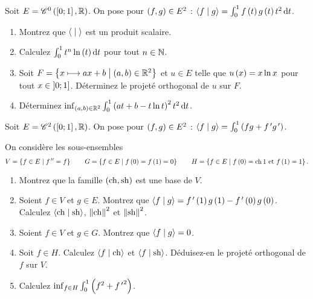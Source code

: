 \begin{exo}
Soit \(E=\mathscr{C}^{0}\left(\left[0;1\right],\mathbb{R}\right)\). On pose pour \(\left(f,g\right)\in E^2\) : \(\ps{f}{g}=\int_0^1f\paren{t}g\paren{t}t^2\odif{t}\).

\begin{enumerate}
    \item Montrez que \(\left\langle\;\middle|\;\right\rangle\) est un produit scalaire. \\
    \item Calculez \(\int_0^1t^n\ln\paren{t}\odif{t}\) pour tout \(n\in\mathbb{N}\). \\
    \item Soit \(F=\left\lbrace x\longmapsto ax+b\;\middle|\;\left(a,b\right)\in\mathbb{R}^2\right\rbrace\) et \(u\in E\) telle que \(u\left(x\right)=x\ln x\) pour tout \(x\in\left]0;1\right]\). Déterminez le projeté orthogonal de \(u\) sur \(F\). \\
    \item Déterminez \(\inf_{\paren{a,b}\in\R^2}\int_0^1\paren{at+b-t\ln t}^2t^2\odif{t}\).
\end{enumerate}
\end{exo}

\begin{exo}
Soit \(E=\mathscr{C}^{2}\left(\left[0;1\right],\mathbb{R}\right)\). On pose pour \(\left(f,g\right)\in E^2\) : \(\left\langle f\;\middle|\; g\right\rangle=\int_0^1\left(fg+f^{\,\prime} g^{\,\prime}\right)\).

On considère les sous-ensembles \[V=\left\lbrace f\in E\;\middle|\; f^{\,\prime\prime}=f\right\rbrace\qquad G=\left\lbrace f\in E\;\middle|\; f\left(0\right)=f\left(1\right)=0\right\rbrace\qquad H=\left\lbrace f\in E\;\middle|\; f\left(0\right)=\operatorname{ch}1\text{ et }f\left(1\right)=1\right\rbrace.\]

\begin{enumerate}
    \item Montrez que la famille \(\left(\operatorname{ch},\operatorname{sh}\right)\) est une base de \(V\). \\
    \item Soient \(f\in V\) et \(g\in E\). Montrez que \(\left\langle f\;\middle|\; g\right\rangle=f^{\,\prime}\left(1\right)g\left(1\right)-f^{\,\prime}\left(0\right)g\left(0\right)\). Calculez \(\left\langle\operatorname{ch}\;\middle|\;\operatorname{sh}\right\rangle\), \(\norme{\ch}^2\) et \(\norme{\sh}^2\). \\
    \item Soient \(f\in V\) et \(g\in G\). Montrez que \(\left\langle f\;\middle|\; g\right\rangle=0\). \\
    \item Soit \(f\in H\). Calculez \(\left\langle f\;\middle|\;\operatorname{ch}\right\rangle\) et \(\left\langle f\;\middle|\;\operatorname{sh}\right\rangle\). Déduisez-en le projeté orthogonal de \(f\) sur \(V\). \\
    \item Calculez \(\inf_{f\in H}\int_0^1\left(f^2+{f^{\,\prime}}^2\right)\).
\end{enumerate}
\end{exo}

